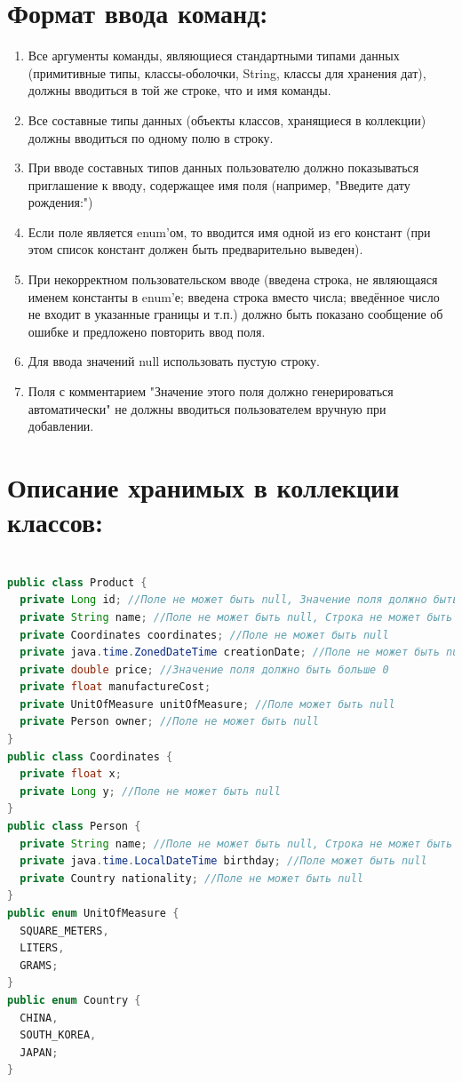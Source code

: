 \documentclass{article}
\begin{document}
\section*{Формат ввода команд:}
\begin{enumerate}
  \item Все аргументы команды, являющиеся стандартными типами данных (примитивные типы, классы-оболочки, String, классы для хранения дат), должны вводиться в той же строке, что и имя команды.
  \item Все составные типы данных (объекты классов, хранящиеся в коллекции) должны вводиться по одному полю в строку.
  \item При вводе составных типов данных пользователю должно показываться приглашение к вводу, содержащее имя поля (например, "Введите дату рождения:")
  \item Если поле является enum'ом, то вводится имя одной из его констант (при этом список констант должен быть предварительно выведен).
  \item При некорректном пользовательском вводе (введена строка, не являющаяся именем константы в enum'е; введена строка вместо числа; введённое число не входит в указанные границы и т.п.) должно быть показано сообщение об ошибке и предложено повторить ввод поля.
  \item Для ввода значений null использовать пустую строку.
  \item Поля с комментарием "Значение этого поля должно генерироваться автоматически" не должны вводиться пользователем вручную при добавлении.
\end{enumerate}

\section*{Описание хранимых в коллекции классов:}
\begin{lstlisting}[language=java]
  
public class Product {
  private Long id; //Поле не может быть null, Значение поля должно быть больше 0, Значение этого поля должно быть уникальным, Значение этого поля должно генерироваться автоматически
  private String name; //Поле не может быть null, Строка не может быть пустой
  private Coordinates coordinates; //Поле не может быть null
  private java.time.ZonedDateTime creationDate; //Поле не может быть null, Значение этого поля должно генерироваться автоматически
  private double price; //Значение поля должно быть больше 0
  private float manufactureCost;
  private UnitOfMeasure unitOfMeasure; //Поле может быть null
  private Person owner; //Поле не может быть null
}
public class Coordinates {
  private float x;
  private Long y; //Поле не может быть null
}
public class Person {
  private String name; //Поле не может быть null, Строка не может быть пустой
  private java.time.LocalDateTime birthday; //Поле может быть null
  private Country nationality; //Поле не может быть null
}
public enum UnitOfMeasure {
  SQUARE_METERS,
  LITERS,
  GRAMS;
}
public enum Country {
  CHINA,
  SOUTH_KOREA,
  JAPAN;
}
\end{lstlisting}
\end{document}
